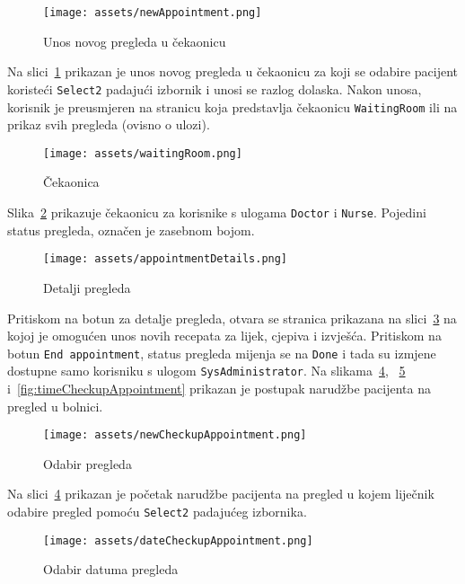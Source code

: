 \begin{figure}[H]
	\texttt{[image: assets/newAppointment.png]}
	\centering
	\caption{Unos novog pregleda u čekaonicu}
	\label{fig:newAppointment}
\end{figure}

Na slici~\ref{fig:newAppointment} prikazan je unos novog pregleda u čekaonicu za koji se odabire pacijent koristeći \texttt{Select2} padajući izbornik i unosi se razlog dolaska. Nakon unosa, korisnik je preusmjeren na stranicu koja predstavlja čekaonicu \texttt{WaitingRoom} ili na prikaz svih pregleda (ovisno o ulozi).

\begin{figure}[H]
	\texttt{[image: assets/waitingRoom.png]}
	\centering
	\caption{Čekaonica}
	\label{fig:waitingRoom}
\end{figure}

Slika~\ref{fig:waitingRoom} prikazuje čekaonicu za korisnike s ulogama \texttt{Doctor} i \texttt{Nurse}. Pojedini status pregleda, označen je zasebnom bojom.

\begin{figure}[H]
	\texttt{[image: assets/appointmentDetails.png]}
	\centering
	\caption{Detalji pregleda}
	\label{fig:appointmentDetails}
\end{figure}

Pritiskom na botun za detalje pregleda, otvara se stranica prikazana na slici~\ref{fig:appointmentDetails} na kojoj je omogućen unos novih recepata za lijek, cjepiva i izvješća. Pritiskom na botun \texttt{End appointment}, status pregleda mijenja se na \texttt{Done} i tada su izmjene dostupne samo korisniku s ulogom \texttt{SysAdministrator}. Na slikama~\ref{fig:newCheckupAppointment}, ~\ref{fig:dateCheckupAppointment} i~\ref{fig:timeCheckupAppointment} prikazan je postupak narudžbe pacijenta na pregled u bolnici.

\begin{figure}[H]
	\texttt{[image: assets/newCheckupAppointment.png]}
	\centering
	\caption{Odabir pregleda}
	\label{fig:newCheckupAppointment}
\end{figure}

Na slici~\ref{fig:newCheckupAppointment} prikazan je početak narudžbe pacijenta na pregled u kojem liječnik odabire pregled pomoću \texttt{Select2} padajućeg izbornika.

\begin{figure}[H]
	\texttt{[image: assets/dateCheckupAppointment.png]}
	\centering
	\caption{Odabir datuma pregleda}
	\label{fig:dateCheckupAppointment}
\end{figure}

